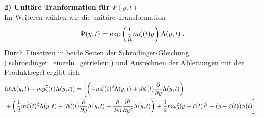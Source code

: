      \textbf{2) Unitäre Tranformation für $\Psi(y,t)$}\\
      Im Weiteren wählen wir die unitäre Transformation
      \begin{equation}
        \Psi(y,t) = \exp\left(\frac{\text i}{\hbar}m\dot \zeta(t) y\right)\Lambda(y,t) \; .
      \end{equation}
      Durch Einsetzen in beide Seiten der Schrödinger-Gleichung (\ref{schroedinger_einzeln_getrieben}) und Ausrechnen der Ableitungen mit der Produktregel ergibt sich
      \begin{align}
        \begin{split}
          &\iffalse\exp\left(\frac{\text i}{\hbar}m\dot \zeta(t) y\right)\fi(\text i \hbar \dot \Lambda(y,t) - my \ddot \zeta(t)\Lambda(y,t)) =
           \iffalse\exp\left(\frac{\text i}{\hbar}m\dot \zeta(t) y\right) \fi\left[\left(-m\dot \zeta(t)^2 \Lambda(y,t) + \text i \hbar \dot \zeta(t) \frac{\partial}{\partial y} \Lambda(y,t) \right) \right. \\
           &\left. + \left(\frac{1}{2}m\dot \zeta(t)^2 \Lambda(y,t) - \text{i} \hbar \dot \zeta(t) \frac{\partial}{\partial y} \Lambda(y,t) - \frac{\hbar}{2m}\frac{\partial^2}{\partial y^2} \Lambda(y,t)  \right)
          + \frac{1}{2}m\omega_0^2(y+\zeta(t))^2  - (y+\zeta(t))S(t)  \right] \; .
        \end{split}
      \end{align}
      \iffalse
      Durch Einsetzen in die Schrödinger-Gleichung und Ausrechnen der Ableitungen erhalten wir für die linke Seite von (\ref{schroedinger_einzeln_getrieben})
      \text e^{\frac{\text i}{\hbar}m\dot \zeta(t) y}(\text i \hbar \dot \Lambda(y,t) - my \ddot \zeta(t)\Lambda(y,t))
      \begin{equation}
      \end{equation}
      und für die rechte Seite
      \begin{align}
        \begin{split}
        \text e^{\frac{\text i}{\hbar}m\dot \zeta(t) y} \left[\left(-m\dot \zeta(t)^2 \Lambda(y,t) + \text i \hbar \dot \zeta(t) \frac{\partial}{\partial y} \Lambda(y,t) \right) + \left(\frac{1}{2}m\dot \zeta(t)^2 \Lambda(y,t) - \text{i} \hbar \dot \zeta(t) \frac{\partial}{\partial y} \Lambda(y,t) - \frac{\hbar}{2m}\frac{\partial^2}{\partial y^2} \Lambda(y,t)  \right) \right. \\
        \left. + \left(\frac{1}{2}m\omega_0^2y^2\Lambda(y,t) + m\omega_0^2y\zeta(t)\Lambda(y,t) + \frac{1}{2}m\omega_0^2 \zeta(t)^2\Lambda(y,t)) \right) + \left(-yS(t)\Lambda(y,t) - \zeta(t) S(t)\Lambda(y,t) \right) \right]
      \end{split}
      \end{align}
      \fi

